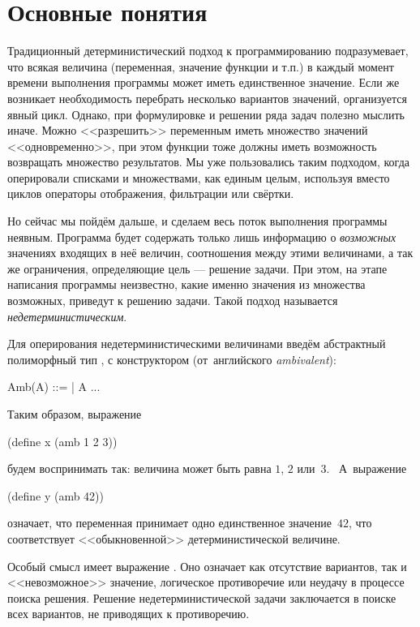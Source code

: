 
\section[2]{Основные понятия}%
Традиционный детерминистический подход к программированию подразумевает, что всякая величина (переменная, значение функции и т.п.) в каждый момент времени выполнения программы может иметь единственное значение. Если же возникает необходимость перебрать несколько вариантов значений, организуется явный цикл.
Однако, при формулировке и решении ряда задач полезно мыслить иначе. Можно <<разрешить>> переменным иметь множество значений <<одновременно>>, при этом функции тоже должны иметь возможность возвращать множество результатов. Мы уже пользовались таким подходом, когда оперировали списками и множествами, как единым целым, используя вместо циклов операторы отображения, фильтрации или свёртки. 

Но сейчас мы пойдём дальше, и сделаем весь поток выполнения программы неявным. Программа будет содержать только лишь информацию о \emph{возможных} значениях входящих в неё величин, соотношения между этими величинами, а так же ограничения, определяющие цель --- решение задачи. При этом, на этапе написания программы неизвестно, какие именно значения из множества возможных, приведут к решению задачи. Такой подход называется \emph{недетерминистическим}.

Для оперирования недетерминистическими величинами введём абстрактный полиморфный тип , с конструктором  (от~английского \emph{ambivalent}):\smallskip
\begin{type}
  Amb(A) ::=  |  A ...\s{)}
\end{type}\smallskip
Таким образом, выражение
\begin{SchemeCode}
  (define x (amb 1 2 3))
\end{SchemeCode}
будем воспринимать так: величина  может быть равна $1$, $2$ или~$3$.~ А~выражение
\begin{SchemeCode}
  (define y (amb 42))
\end{SchemeCode}
означает, что переменная  принимает одно единственное значение~$42$, что соответствует <<обыкновенной>> детерминистической величине.

Особый смысл имеет выражение . Оно означает как отсутствие вариантов, так и <<невозможное>> значение, логическое противоречие или неудачу в процессе поиска решения. Решение недетерминистической задачи заключается в поиске всех вариантов, не приводящих к противоречию.

